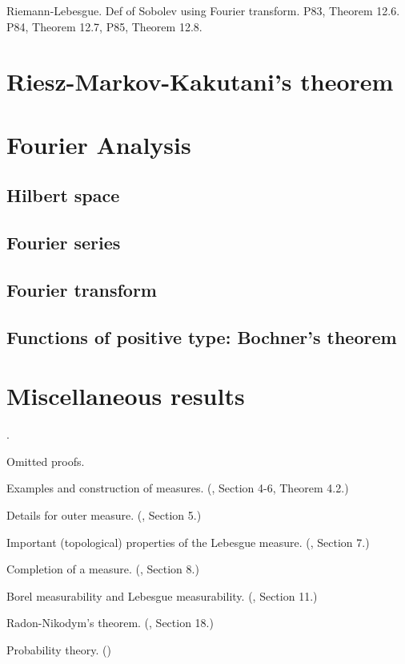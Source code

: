 \documentclass[openany, a4paper, oneside]{jsbook}
\newcounter{enum2}
\renewenvironment{enumerate}{%
\begin{list}%
{%
\arabic{enum2}.\ \,%
}%
{%
\usecounter{enum2}
\setlength{\itemindent}{0pt}%
\setlength{\leftmargin}{15pt}%
\setlength{\rightmargin}{0pt}%
\setlength{\labelsep}{0pt}%
\setlength{\labelwidth}{6pt}%
\setlength{\itemsep}{0pt}%
\setlength{\parsep}{0pt}%
\setlength{\listparindent}{0pt}%
}
}{%
\end{list}%
}
\theoremstyle{break}
\theoremstyle{breakdefn}
\begin{document}
Riemann-Lebesgue.
Def of Sobolev using Fourier transform.
P83, Theorem 12.6.
P84, Theorem 12.7,
P85, Theorem 12.8.
\section{Riesz-Markov-Kakutani's theorem}

\section{Fourier Analysis}

\subsection{Hilbert space}

\subsection{Fourier series}

\subsection{Fourier transform}

\subsection{Functions of positive type: Bochner's theorem}

\section{Miscellaneous results}


\begin{enumerate}
\item Omitted proofs.
\item Examples and construction of measures. (\cite{SeizoIto1}, Section 4-6, Theorem 4.2.)
\item Details for outer measure. (\cite{SeizoIto1}, Section 5.)
\item Important (topological) properties of the Lebesgue measure. (\cite{SeizoIto1}, Section 7.)
\item Completion of a measure. (\cite{SeizoIto1}, Section 8.)
\item Borel measurability and Lebesgue measurability. (\cite{SeizoIto1}, Section 11.)
\item Radon-Nikodym's theorem. (\cite{SeizoIto1}, Section 18.)
\item Probability theory. (\cite{DavidWilliams1, TadahisaFunaki1})
\end{enumerate}
\end{document}
